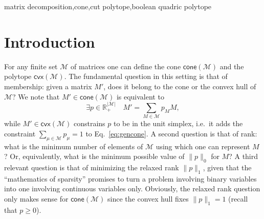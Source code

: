 \documentclass[envcountsect,envcountsame]{svjour3}
\theoremstyle{changebreak}                %
\newcommand{\cone}[1]{\mathsf{cone}(#1)}
\newcommand{\cvx}[1]{\mathsf{cvx}(#1)}
\begin{document}
\begin{abstract}
  We prove the \textbf{NP}-hardness, using Karp reductions, of some problems related to the correlation polytope and its corresponding cone, spanned by all of the $n\times n$ rank-one matrices over $\{0,1\}$. The problems are: membership, rank of the decomposition, and a ``relaxed rank'' obtained from relaxing the zero-norm expression for the rank to an $\ell_1$ norm. While membership and rank are natural problems for any matrix cone, the relaxed rank problem occurs in some signal processing and statistical applications. 
  
\ifspringer
  \else
  \ifelsevier
  \else
 \textbf{Keywords}: matrix decomposition, cone, cut polytope, boolean quadric polytope.
 \fi
 \fi
\end{abstract}

\ifelsevier
\begin{keywords}
  matrix decomposition\sep cone\sep cut polytope\sep boolean quadric polytope
\end{keywords}
\maketitle
\fi


\section{Introduction}
\label{s:intro}
For any finite set $\mathcal{M}$ of matrices one can define the cone $\cone{\mathcal{M}}$ and the polytope $\cvx{\mathcal{M}}$. The fundamental question in this setting is that of membership: given a matrix $M'$, does it belong to the cone or the convex hull of $\mathcal{M}$? We note that $M'\in\cone{\mathcal{M}}$ is equivalent to
\begin{equation}
  \exists p\in\mathbb{R}^{|\mathcal{M}|}_+\quad M' = \sum_{M\in\mathcal{M}} p_M M,\label{eq:gencone}
\end{equation}
while $M'\in\cvx{\mathcal{M}}$ constrains $p$ to be in the unit simplex, i.e.~it adds the constraint $\sum_{\mu\in\mathcal{M}} p_\mu=1$ to Eq.~\eqref{eq:gencone}.
A second question is that of rank: what is the minimum number of elements of $\mathcal{M}$ using which one can represent $M$? Or, equivalently, what is the minimum possible value of $\|p\|_0$ for $M$? A third relevant question is that of minimizing the relaxed rank $\|p\|_1$, given that the ``mathematics of sparsity'' \cite{candes} promises to turn a problem involving binary variables into one involving continuous variables only. Obviously, the relaxed rank question only makes sense for $\cone{\mathcal{M}}$ since the convex hull fixes $\|p\|_1=1$ (recall that $p\ge 0$). 
\end{document}
